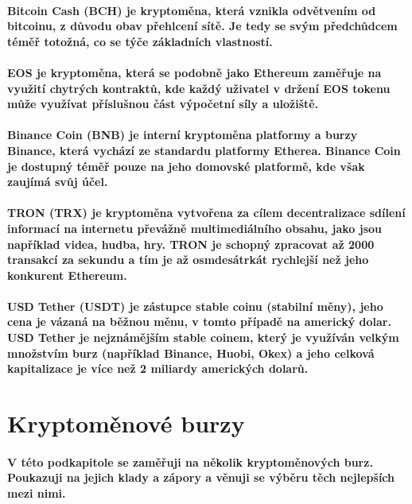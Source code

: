 \documentclass[thesis=B,czech]{FITthesis}[2019/03/21]
\begin{document}
\paragraph{
Bitcoin Cash (BCH) je kryptoměna, která vznikla odvětvením od bitcoinu, z důvodu obav přehlcení sítě. Je tedy se svým předchůdcem téměř totožná, co se týče základních vlastností. \cite{kurzy_bch}
}
\paragraph{
EOS je kryptoměna, která se podobně jako Ethereum zaměřuje na využití chytrých kontraktů, kde každý uživatel v držení EOS tokenu může využívat příslušnou část výpočetní síly a uložiště. \cite{finex_eos}
}
\paragraph{
Binance Coin (BNB) je interní kryptoměna platformy a burzy Binance, která vychází ze standardu platformy Etherea. Binance Coin je dostupný téměř pouze na jeho domovské platformě, kde však zaujímá svůj účel. \cite{martin_sistek_bnb}
}
\paragraph{
TRON (TRX) je kryptoměna vytvořena za cílem decentralizace sdílení informací na internetu převážně multimediálního obsahu, jako jsou například videa, hudba, hry. TRON je schopný zpracovat až 2000 transakcí za sekundu a tím je až osmdesátrkát rychlejší než jeho konkurent Ethereum. \cite{finex_trx}
}
\paragraph{
USD Tether (USDT) je zástupce stable coinu (stabilní měny), jeho cena je vázaná na běžnou měnu, v tomto případě na americký dolar. USD Tether je nejznámějším stable coinem, který je využíván velkým množstvím burz (například Binance, Huobi, Okex) a jeho celková kapitalizace je více než 2 miliardy amerických dolarů. \cite{mlady_investor_stable_coin} 
}
\section{Kryptoměnové burzy}
\paragraph{
V této podkapitole se zaměřuji na několik kryptoměnových burz. Poukazuji na jejich klady a zápory a věnuji se výběru těch nejlepších mezi nimi.
}
\end{document}
